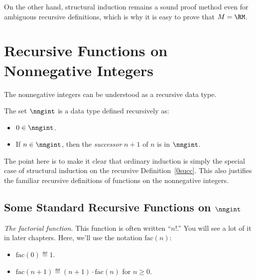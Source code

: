 On the other hand, structural induction remains a sound proof method even
for ambiguous recursive definitions, which is why it is easy to prove
that $M=\RM$.
\fi

\begin{problems}

\practiceproblems
{}

\classproblems
{}

\homeworkproblems
{}

\examproblems
{}
\end{problems}

\section{Recursive Functions on Nonnegative Integers}

The nonnegative integers can be understood as a recursive data type.
\begin{definition}\label{0succ}
The set $\nngint$ is a data type defined recursively as:
\begin{itemize}
\item $0 \in \nngint$.
\item If $n \in \nngint$, then the \emph{successor} $n+1$ of $n$ is in
$\nngint$.
\end{itemize}

\end{definition}

The point here is to make it clear that ordinary induction is simply the
special case of structural induction on the recursive
Definition~\ref{0succ}.  This also justifies the familiar recursive
definitions of functions on the nonnegative integers.

\subsection{Some Standard Recursive Functions on $\nngint$}

\begin{example}\label{factorial-def}

\emph{The factorial%
 function.}  This function is often written
``$n!$.''  You will see a lot of it in later chapters.  Here, we'll use
the notation $\text{fac}(n)$:
\begin{itemize}
\item $\text{fac}(0) \eqdef 1$.
\item $\text{fac}(n+1) \eqdef (n+1)\cdot \text{fac}(n)$ for $n \ge 0$.
\end{itemize}
\end{example}

